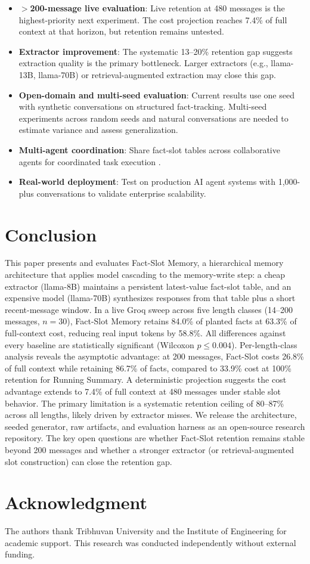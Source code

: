 \documentclass[conference]{IEEEtran}
\begin{document}
\begin{itemize}
    \item \textbf{$>$200-message live evaluation}: Live retention at 480 messages is the highest-priority next experiment. The cost projection reaches 7.4\% of full context at that horizon, but retention remains untested.
    \item \textbf{Extractor improvement}: The systematic 13--20\% retention gap suggests extraction quality is the primary bottleneck. Larger extractors (e.g., llama-13B, llama-70B) or retrieval-augmented extraction may close this gap.
    \item \textbf{Open-domain and multi-seed evaluation}: Current results use one seed with synthetic conversations on structured fact-tracking. Multi-seed experiments across random seeds and natural conversations are needed to estimate variance and assess generalization.
    \item \textbf{Multi-agent coordination}: Share fact-slot tables across collaborative agents for coordinated task execution \cite{zhou2024agents}.
    \item \textbf{Real-world deployment}: Test on production AI agent systems with 1,000-plus conversations to validate enterprise scalability.
\end{itemize}

\section{Conclusion}

This paper presents and evaluates Fact-Slot Memory, a hierarchical memory architecture that applies model cascading to the memory-write step: a cheap extractor (llama-8B) maintains a persistent latest-value fact-slot table, and an expensive model (llama-70B) synthesizes responses from that table plus a short recent-message window. In a live Groq sweep across five length classes (14--200 messages, $n=30$), Fact-Slot Memory retains 84.0\% of planted facts at 63.3\% of full-context cost, reducing real input tokens by 58.8\%. All differences against every baseline are statistically significant (Wilcoxon $p \leq 0.004$). Per-length-class analysis reveals the asymptotic advantage: at 200 messages, Fact-Slot costs 26.8\% of full context while retaining 86.7\% of facts, compared to 33.9\% cost at 100\% retention for Running Summary. A deterministic projection suggests the cost advantage extends to 7.4\% of full context at 480 messages under stable slot behavior. The primary limitation is a systematic retention ceiling of 80--87\% across all lengths, likely driven by extractor misses. We release the architecture, seeded generator, raw artifacts, and evaluation harness as an open-source research repository. The key open questions are whether Fact-Slot retention remains stable beyond 200 messages and whether a stronger extractor (or retrieval-augmented slot construction) can close the retention gap.

\section*{Acknowledgment}

The authors thank Tribhuvan University and the Institute of Engineering for academic support. This research was conducted independently without external funding.



\end{document}
